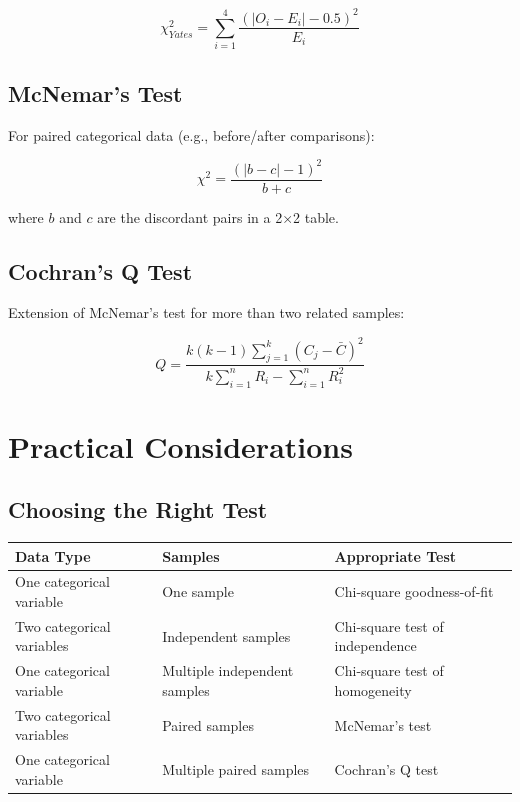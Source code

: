 \documentclass[twoside]{book}
\begin{document}
\begin{equation}
\chi^2_{Yates} = \sum_{i=1}^{4} \frac{(|O_i - E_i| - 0.5)^2}{E_i}
\end{equation}

\subsection{McNemar's Test}

For paired categorical data (e.g., before/after comparisons):

\begin{equation}
\chi^2 = \frac{(|b - c| - 1)^2}{b + c}
\end{equation}

where $b$ and $c$ are the discordant pairs in a 2×2 table.

\subsection{Cochran's Q Test}

Extension of McNemar's test for more than two related samples:

\begin{equation}
Q = \frac{k(k-1)\sum_{j=1}^{k}(C_j - \bar{C})^2}{k\sum_{i=1}^{n}R_i - \sum_{i=1}^{n}R_i^2}
\end{equation}

\section{Practical Considerations}

\subsection{Choosing the Right Test}

\begin{center}
\begin{tabular}{|p{3cm}|p{3cm}|p{6cm}|}
\hline
\textbf{Data Type} & \textbf{Samples} & \textbf{Appropriate Test} \\
\hline
One categorical variable & One sample & Chi-square goodness-of-fit \\
\hline
Two categorical variables & Independent samples & Chi-square test of independence \\
\hline
One categorical variable & Multiple independent samples & Chi-square test of homogeneity \\
\hline
Two categorical variables & Paired samples & McNemar's test \\
\hline
One categorical variable & Multiple paired samples & Cochran's Q test \\
\hline
\end{tabular}
\end{center}
\end{document}
